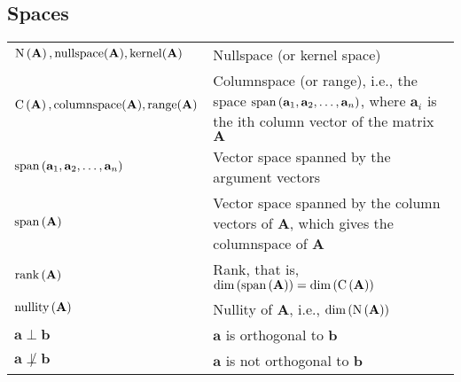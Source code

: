 \documentclass{article}
\renewcommand{\dim}[1]{\ensuremath{\textnormal{dim}\left(#1\right)}} %
\newcommand{\nullspace}[1]{\ensuremath{\textnormal{N}\left(#1\right)}} %
\newcommand{\nullity}[1]{\ensuremath{\textnormal{nullity}\left(#1\right)}} %
\renewcommand{\span}[1]{\ensuremath{\textnormal{span}\left(#1\right)}} %
\newcommand{\range}[1]{\ensuremath{\textnormal{C}\left(#1\right)}} %
\newcommand{\rank}[1]{\ensuremath{\textnormal{rank}\left(#1\right)}} %
\begin{document}
\subsection{Spaces}
\begin{xltabular}{\textwidth}{XX}
    \(\nullspace{\mathbf{A}}, \mathrm{nullspace}(\mathbf{A}), \mathrm{kernel}(\mathbf{A})\) & Nullspace (or kernel space)\\
    \(\range{\mathbf{A}}, \mathrm{columnspace}(\mathbf{A}), \mathrm{range}(\mathbf{A})\) & Columnspace (or range), i.e., the space \(\span{\mathbf{a}_1,\mathbf{a}_2, \dots, \mathbf{a}_n}\), where \(\mathbf{a}_i\) is the ith column vector of the matrix \(\mathbf{A}\)\\
    \(\span{\mathbf{a}_1, \mathbf{a}_2, \dots, \mathbf{a}_n}\) & Vector space spanned by the argument vectors\\
    \(\span{\mathbf{A}}\) & Vector space spanned by the column vectors of \(\mathbf{A}\), which gives the columnspace of \(\mathbf{A}\)\\
    \(\rank{\mathbf{A}}\) & Rank, that is, \(\dim{\span{\mathbf{A}}} = \dim{\range{\mathbf{A}}}\)\\
    \(\nullity{\mathbf{A}}\) & Nullity of \(\mathbf{A}\), i.e., \(\dim{\nullspace{\mathbf{A}}}\)\\
    \(\mathbf{a} \perp \mathbf{b}\) & \(\mathbf{a}\) is orthogonal to \(\mathbf{b}\)\\
    \(\mathbf{a} \not\perp \mathbf{b}\) & \(\mathbf{a}\) is not orthogonal to \(\mathbf{b}\)\\
\end{xltabular}
\end{document}
